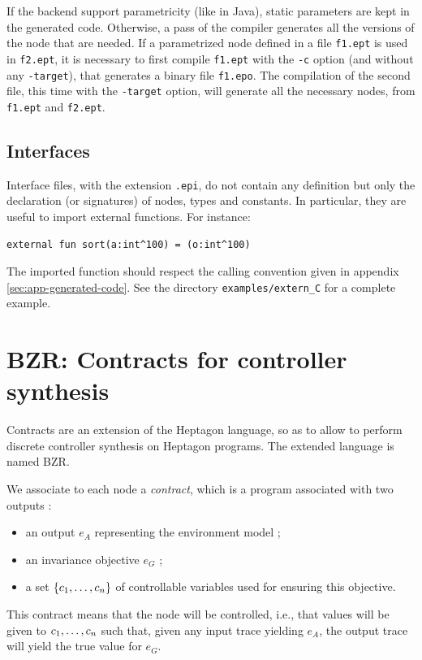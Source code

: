 \documentclass[a4paper]{article}
\begin{document}
If the backend support parametricity (like in Java), static parameters are kept in the generated code. Otherwise, a pass of the compiler generates all the versions of the node that are needed. If a parametrized node defined in a file \texttt{f1.ept} is used in \texttt{f2.ept}, it is necessary to first compile \texttt{f1.ept} with the \texttt{-c} option (and without any \texttt{-target}), that generates a binary file \texttt{f1.epo}. The compilation of the second file, this time with the \texttt{-target} option, will generate all the necessary nodes, from \texttt{f1.ept} and \texttt{f2.ept}.


\subsection{Interfaces}

Interface files, with the extension \texttt{.epi}, do not contain any definition but only the declaration (or signatures) of nodes, types and constants. In particular, they are useful to import external functions. For instance:
\begin{lstlisting}
external fun sort(a:int^100) = (o:int^100)
\end{lstlisting}
The imported function should respect the calling convention given in appendix \ref{sec:app-generated-code}. See the directory \texttt{examples/extern\_C} for a complete example.

\section{BZR: Contracts for controller synthesis}
\label{sec:extens-with-contr}

Contracts are an extension of the Heptagon language, so as to allow to perform
discrete controller synthesis on Heptagon programs. The extended language is
named BZR.

We associate to each node a \emph{contract}, which is a program associated with
two outputs :
\begin{itemize}
\item an output $e_A$ representing the environment model ;
\item an invariance objective $e_G$ ;
\item a set $\set{\ton{c}{,}}$ of controllable variables used for ensuring this objective.
\end{itemize}

This contract means that the node will be controlled, i.e., that values will be
given to $\ton{c}{,}$ such that, given any input trace yielding $e_A$, the
output trace will yield the true value for $e_G$.
\end{document}
